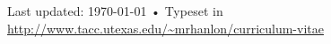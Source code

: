 \documentclass[10pt, a4paper]{article}
\begin{document}
\vfill{}

\begin{center}
{\scriptsize  Last updated: \today\- •\- 
Typeset in \href{http://nitens.org/taraborelli/cvtex}{
\XeTeX }\\
\href{http://www.tacc.utexas.edu/~mrhanlon/curriculum-vitae}{http://www.tacc.utexas.edu/\textasciitilde{}mrhanlon/curriculum-vitae}}
\end{center}
\end{document}
